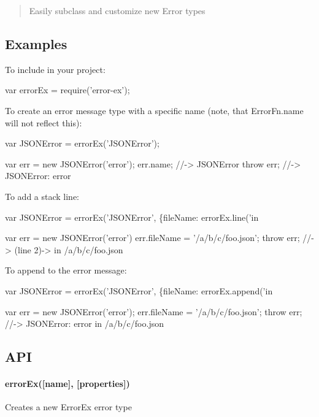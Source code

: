 \begin{quote}
Easily subclass and customize new Error types \end{quote}


\subsection*{Examples}

To include in your project\+: 
\begin{DoxyCode}
var errorEx = require('error-ex');
\end{DoxyCode}


To create an error message type with a specific name (note, that {\ttfamily Error\+Fn.\+name} will not reflect this)\+: 
\begin{DoxyCode}
var JSONError = errorEx('JSONError');

var err = new JSONError('error');
err.name; //-> JSONError
throw err; //-> JSONError: error
\end{DoxyCode}


To add a stack line\+: 
\begin{DoxyCode}
var JSONError = errorEx('JSONError', \{fileName: errorEx.line('in %

var err = new JSONError('error')
err.fileName = '/a/b/c/foo.json';
throw err; //-> (line 2)-> in /a/b/c/foo.json
\end{DoxyCode}


To append to the error message\+: 
\begin{DoxyCode}
var JSONError = errorEx('JSONError', \{fileName: errorEx.append('in %

var err = new JSONError('error');
err.fileName = '/a/b/c/foo.json';
throw err; //-> JSONError: error in /a/b/c/foo.json
\end{DoxyCode}


\subsection*{A\+PI}

\paragraph*{{\ttfamily error\+Ex(\mbox{[}name\mbox{]}, \mbox{[}properties\mbox{]})}}

Creates a new Error\+Ex error type


